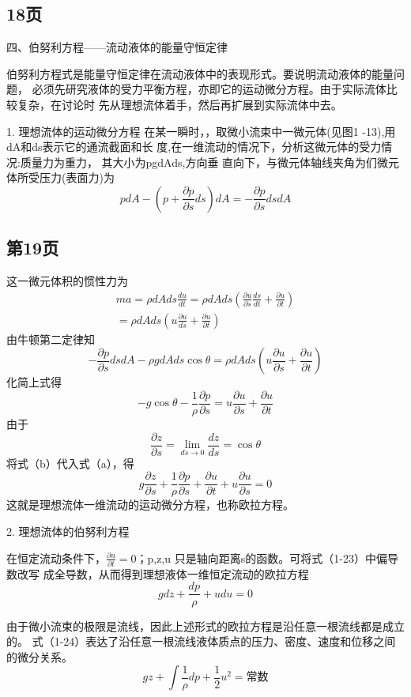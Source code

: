 \subsection{18页}
四、伯努利方程——流动液体的能量守恒定律

伯努利方程式是能量守恒定律在流动液体中的表现形式。要说明流动液体的能量问题， 必须先研究液体的受力平衡方程，亦即它的运动微分方程。由于实际流体比较复杂，在讨论时 先从理想流体着手，然后再扩展到实际流体中去。

1.	理想流体的运动微分方程
在某一瞬时，，取微小流束中一微元体(见图1 -13),用dA和ds表示它的通流截面和长 度,在一维流动的情况下，分析这微元体的受力情况:质量力为重力，
其大小为pgdAds,方向垂 直向下，与微元体轴线夹角为们微元体所受压力(表面力)为
\[pdA - \left( {p + \frac{{\partial p}}{{\partial s}}ds} \right)dA = -\frac{{\partial p}}{{\partial s}}dsdA\]

\subsection{第19页}
这一微元体积的惯性力为
\[\begin{array}{l}
  ma = \rho dAds\frac{{du}}{{dt}} = \rho dAds\left( {\frac{{\partial u}}{{\partial s}}\frac{{ds}}{{dt}} + \frac{{\partial u}}{{\partial t}}} \right)\\
   = \rho dAds\left( {u\frac{{\partial u}}{{ds}} + \frac{{\partial u}}{{\partial t}}} \right)
  \end{array}\]
由牛顿第二定律知
\[ - \frac{{\partial p}}{{\partial s}}dsdA - \rho gdAds\cos \theta  = \rho dAds\left( {u\frac{{\partial u}}{{\partial s}} + \frac{{\partial u}}{{\partial t}}} \right)\]
化简上式得
\[ - g\cos \theta  - \frac{1}{\rho }\frac{{\partial p}}{{\partial s}} = u\frac{{\partial u}}{{\partial s}} + \frac{{\partial u}}{{\partial t}}\]
由于
\[\frac{{\partial z}}{{\partial s}} = \mathop {\lim }\limits_{ds \to 0} \frac{{dz}}{{ds}} = \cos \theta \]
将式（b）代入式（a），得
\[g\frac{{\partial z}}{{\partial s}} + \frac{1}{\rho }\frac{{\partial p}}{{\partial s}} + \frac{{\partial u}}{{\partial t}} + u\frac{{\partial u}}{{\partial s}} = 0\]
这就是理想流体一维流动的运动微分方程，也称欧拉方程。

2.	理想流体的伯努利方程

在恒定流动条件下，$ \frac{{\partial u}}{{\partial t}}=0 $；p,z,u
只是轴向距离s的函数。可将式（1-23）中偏导数改写
成全导数，从而得到理想液体一维恒定流动的欧拉方程
\[gdz + \frac{{dp}}{\rho } + udu = 0\]

由于微小流束的极限是流线，因此上述形式的欧拉方程是沿任意一根流线都是成立的。
式（1-24）表达了沿任意一根流线液体质点的压力、密度、速度和位移之间的微分关系。
$$gz + \int {\frac{1}{\rho }} dp + \frac{1}{2}{u^2} = \text{常数} $$ 


